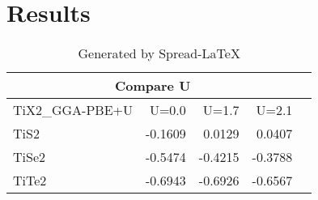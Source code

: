 \chapter{Results}
\begin{table}[!htp]\centering
\caption{Generated by Spread-LaTeX}\label{tab: }
\scriptsize
\begin{tabular}{lrrrr}\toprule
\multicolumn{4}{c}{Compare U} \\\midrule
TiX2\_GGA-PBE+U &U=0.0 &U=1.7 &U=2.1 \\
TiS2 &-0.1609 &0.0129 &0.0407 \\
TiSe2 &-0.5474 &-0.4215 &-0.3788 \\
TiTe2 &-0.6943 &-0.6926 &-0.6567 \\
\bottomrule
\end{tabular}
\end{table}